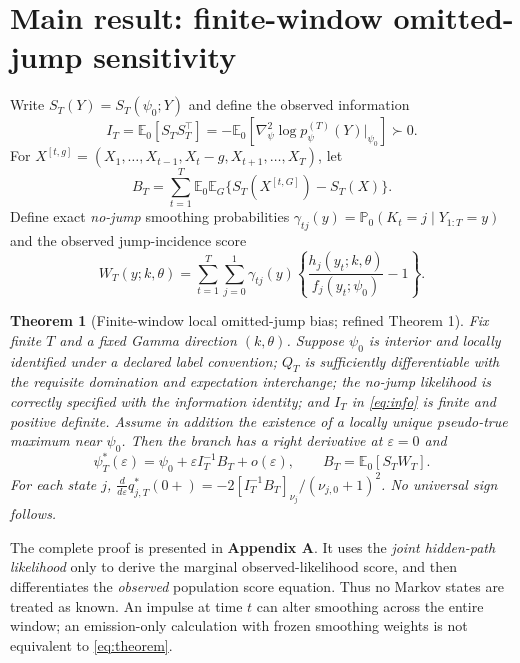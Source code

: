 \documentclass[11pt,a4paper]{article}
\newtheorem{theorem}{Theorem}
\newcommand{\E}{\mathbb E}
\newcommand{\Prb}{\mathbb P}
\newcommand{\eps}{\varepsilon}
\begin{document}
\section{Main result: finite-window omitted-jump sensitivity}
Write $S_T(Y)=S_T(\psi_0;Y)$ and define the observed information
\begin{equation}
I_T=\E_0[S_T S_T^\top]=-\E_0\left[\nabla_\psi^2\log p_\psi^{(T)}(Y)\big|_{\psi_0}\right]\succ0.\label{eq:info}
\end{equation}
For $X^{[t,g]}=(X_1,\ldots,X_{t-1},X_t-g,X_{t+1},\ldots,X_T)$, let
\begin{equation}
B_T=\sum_{t=1}^T\E_0\E_G\{S_T(X^{[t,G]})-S_T(X)\}.\label{eq:single}
\end{equation}
Define exact \emph{no-jump} smoothing probabilities $\gamma_{tj}(y)=\Prb_0(K_t=j\mid Y_{1:T}=y)$ and the observed jump-incidence score
\begin{equation}
W_T(y;k,\theta)=\sum_{t=1}^T\sum_{j=0}^1\gamma_{tj}(y)
\left\{\frac{h_j(y_t;k,\theta)}{f_j(y_t;\psi_0)}-1\right\}.\label{eq:W}
\end{equation}
\begin{theorem}[Finite-window local omitted-jump bias; refined Theorem 1]\label{thm:main}
Fix finite $T$ and a fixed Gamma direction $(k,\theta)$. Suppose $\psi_0$ is interior and locally identified under a declared label convention; $Q_T$ is sufficiently differentiable with the requisite domination and expectation interchange; the no-jump likelihood is correctly specified with the information identity; and $I_T$ in \eqref{eq:info} is finite and positive definite. Assume in addition the existence of a locally unique pseudo-true maximum near $\psi_0$. Then the branch has a right derivative at $\eps=0$ and
\begin{equation}
\boxed{\quad\psi_T^*(\eps)=\psi_0+\eps I_T^{-1}B_T+o(\eps),\qquad
B_T=\E_0[S_TW_T].\quad}\label{eq:theorem}
\end{equation}
For each state $j$, $\frac{d}{d\eps}q_{j,T}^*(0+)=-2[ I_T^{-1}B_T]_{\nu_j}/(\nu_{j,0}+1)^2$. No universal sign follows.
\end{theorem}
The complete proof is presented in \textbf{Appendix A}. It uses the \emph{joint hidden-path likelihood} only to derive the marginal observed-likelihood score, and then differentiates the \emph{observed} population score equation. Thus no Markov states are treated as known. An impulse at time $t$ can alter smoothing across the entire window; an emission-only calculation with frozen smoothing weights is not equivalent to \eqref{eq:theorem}.
\end{document}
